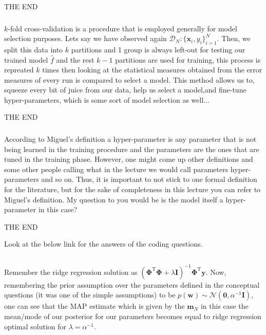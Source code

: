 \documentclass{article}
\begin{document}
\begin{center}
   THE END
\end{center}

\subsubsection{}
  $k$-fold cross-validation is a procedure that is employed generally for model selection purposes. Lets say we have observed again $\mathcal{D}_N:\{\mathbf{x}_i, y_i\}_{i=1}^{N}$. Then, we split this data into $k$ partitions and 1 group is always left-out for testing our trained model $\hat{f}$ and the rest $k-1$ partitions are used for training, this process is repreated $k$ times then looking at the statistical measures obtained from the error measures of every run is compared to select a model. This method allows us to, squeeze every bit of juice from our data, help us select a model,and fine-tune hyper-parameters, which is some sort of model selection as well...

\begin{center}
   THE END
\end{center}

\subsubsection{}
According to Miguel's definition a hyper-parameter is any parameter that is not being learned in the training procedure and the parameters are the ones that are tuned in the training phase. However, one might come up other definitions and some other people calling what in the lecture we would call parameters hyper-parameters and so on. Thus, it is important to not stick to one formal definition for the literature, but for the sake of completeness in this lecture you can refer to Miguel's definition. My question to you would be is the model itself a hyper-parameter in this case?

\begin{center}
   THE END
\end{center}


Look at the below link for the answers of the coding questions.

\subsection{}

Remember the ridge regression solution as $(\boldsymbol{\Phi}^\text{T}\boldsymbol{\Phi}+\lambda\mathbf{I})^{-1}\boldsymbol{\Phi}^\text{T}\mathbf{y}$. Now, remembering the prior assumption over the parameters defined in the conceptual questions (it was one of the simple assumptions) to be $p(\mathbf{w})\sim\mathcal{N}(\mathbf{0}, \alpha^{-1}\mathbf{I})$, one can see that the MAP estimate which is given by the $\mathbf{m}_N$ in this case the mean/mode of our posterior for our parameters becomes equal to ridge regression optimal solution for $\lambda=\alpha^{-1}$.
\end{document}
